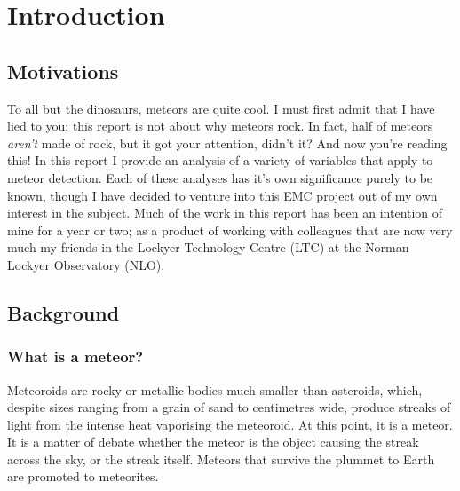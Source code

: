 \chapter{Introduction}
\label{chap:intro}
\section{Motivations}
To all but the dinosaurs, meteors are quite cool. I must first admit that I have lied to you: this report is not about why meteors rock. In fact, half of meteors {\it aren't} made of rock, but it got your attention, didn't it? And now you're reading this! In this report I provide an analysis of a variety of variables that apply to meteor detection. Each of these analyses has it's own significance purely to be known, though I have decided to venture into this EMC project out of my own interest in the subject. Much of the work in this report has been an intention of mine for a year or two; as a product of working with colleagues that are now very much my friends in the Lockyer Technology Centre (LTC) at the Norman Lockyer Observatory (NLO).
\section{Background}
\subsection{What is a meteor?}
Meteoroids are rocky or metallic bodies much smaller than asteroids, which, despite sizes ranging from a grain of sand to centimetres wide, produce streaks of light from the intense heat vaporising the meteoroid. At this point, it is a meteor. It is a matter of debate whether the meteor is the object causing the streak across the sky, or the streak itself. Meteors that survive the plummet to Earth are promoted to meteorites. \\
